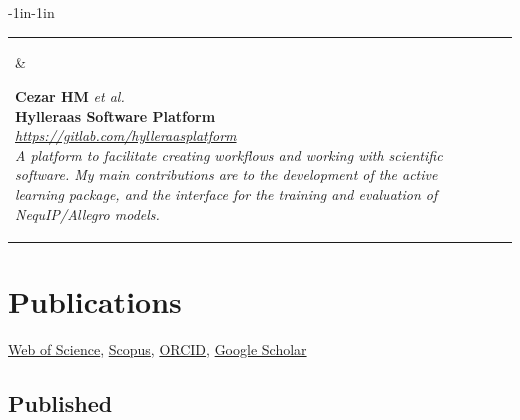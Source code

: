 \documentclass[10pt]{article}
\newcommand{\newsoftware}[3]{
\begin{adjustwidth}{-1in}{-1in}  
\begin{tabular}{p{0.9in}p{7in}}
\parbox[c]{0.9in}{} & \parbox[c]{6in}{\setstretch{0.9} {\scriptsize {#1}} \\ {\bf #2}  \\ {\footnotesize\emph {#3}}}
\end{tabular}
\end{adjustwidth}
\vspace{0.2in}
}
\begin{document}
\newsoftware{\textbf{Cezar HM} \textit{et al.}}{Hylleraas Software Platform}{\href{https://gitlab.com/hylleraasplatform}{https://gitlab.com/hylleraasplatform} \\ 
A platform to facilitate creating workflows and working with scientific software. My main contributions are to the development of the active learning package, and the interface for the training and evaluation of NequIP/Allegro models.}





\section*{Publications}


\href{https://www.webofscience.com/wos/author/record/445303}{Web of Science}, 
\href{https://www.scopus.com/authid/detail.uri?authorId=57188802591}{Scopus},
\href{https://orcid.org/0000-0002-7553-0482}{ORCID}, 
\href{https://scholar.google.com.br/citations?hl=pt-BR&user=LtBk3gEAAAAJ}{Google Scholar} 




\subsection*{Published}
\end{document}

